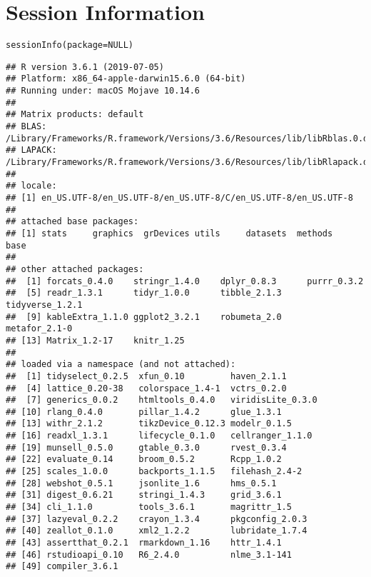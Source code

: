 \documentclass{article}\usepackage[]{graphicx}\usepackage[]{color}
\makeatletter
\newcommand{\hlstd}[1]{\textcolor[rgb]{0.196,0.196,0.196}{#1}}%
\newcommand{\hlkwa}[1]{\textcolor[rgb]{0.231,0.416,0.784}{#1}}%
\newcommand{\hlkwc}[1]{\textcolor[rgb]{0,0.631,0.314}{#1}}%
\newcommand{\hlkwd}[1]{\textcolor[rgb]{0.78,0.227,0.412}{#1}}%
\newenvironment{kframe}{%
 \def\at@end@of@kframe{}%
 \ifinner\ifhmode%
  \def\at@end@of@kframe{\end{minipage}}%
  \begin{minipage}{\columnwidth}%
 \fi\fi%
 \def\FrameCommand##1{\hskip\@totalleftmargin \hskip-\fboxsep
 \colorbox{shadecolor}{##1}\hskip-\fboxsep
     \hskip-\linewidth \hskip-\@totalleftmargin \hskip\columnwidth}%
 \MakeFramed {\advance\hsize-\width
   \@totalleftmargin\z@ \linewidth\hsize
   \@setminipage}}%
 {\par\unskip\endMakeFramed%
 \at@end@of@kframe}
\newenvironment{knitrout}{}{} %
\renewenvironment{knitrout}{\renewcommand{\baselinestretch}{1}}{} %
\makeatother
\begin{document}

\section{Session Information}

\begin{knitrout}
\color{fgcolor}\begin{kframe}
\begin{alltt}
  \hlkwd{sessionInfo}\hlstd{(}\hlkwc{package} \hlstd{=} \hlkwa{NULL}\hlstd{)}
\end{alltt}
\begin{verbatim}
## R version 3.6.1 (2019-07-05)
## Platform: x86_64-apple-darwin15.6.0 (64-bit)
## Running under: macOS Mojave 10.14.6
## 
## Matrix products: default
## BLAS:   /Library/Frameworks/R.framework/Versions/3.6/Resources/lib/libRblas.0.dylib
## LAPACK: /Library/Frameworks/R.framework/Versions/3.6/Resources/lib/libRlapack.dylib
## 
## locale:
## [1] en_US.UTF-8/en_US.UTF-8/en_US.UTF-8/C/en_US.UTF-8/en_US.UTF-8
## 
## attached base packages:
## [1] stats     graphics  grDevices utils     datasets  methods   base     
## 
## other attached packages:
##  [1] forcats_0.4.0    stringr_1.4.0    dplyr_0.8.3      purrr_0.3.2     
##  [5] readr_1.3.1      tidyr_1.0.0      tibble_2.1.3     tidyverse_1.2.1 
##  [9] kableExtra_1.1.0 ggplot2_3.2.1    robumeta_2.0     metafor_2.1-0   
## [13] Matrix_1.2-17    knitr_1.25      
## 
## loaded via a namespace (and not attached):
##  [1] tidyselect_0.2.5  xfun_0.10         haven_2.1.1      
##  [4] lattice_0.20-38   colorspace_1.4-1  vctrs_0.2.0      
##  [7] generics_0.0.2    htmltools_0.4.0   viridisLite_0.3.0
## [10] rlang_0.4.0       pillar_1.4.2      glue_1.3.1       
## [13] withr_2.1.2       tikzDevice_0.12.3 modelr_0.1.5     
## [16] readxl_1.3.1      lifecycle_0.1.0   cellranger_1.1.0 
## [19] munsell_0.5.0     gtable_0.3.0      rvest_0.3.4      
## [22] evaluate_0.14     broom_0.5.2       Rcpp_1.0.2       
## [25] scales_1.0.0      backports_1.1.5   filehash_2.4-2   
## [28] webshot_0.5.1     jsonlite_1.6      hms_0.5.1        
## [31] digest_0.6.21     stringi_1.4.3     grid_3.6.1       
## [34] cli_1.1.0         tools_3.6.1       magrittr_1.5     
## [37] lazyeval_0.2.2    crayon_1.3.4      pkgconfig_2.0.3  
## [40] zeallot_0.1.0     xml2_1.2.2        lubridate_1.7.4  
## [43] assertthat_0.2.1  rmarkdown_1.16    httr_1.4.1       
## [46] rstudioapi_0.10   R6_2.4.0          nlme_3.1-141     
## [49] compiler_3.6.1
\end{verbatim}
\end{kframe}
\end{knitrout}
  
\newpage

{}
\printbibliography
\end{document}
